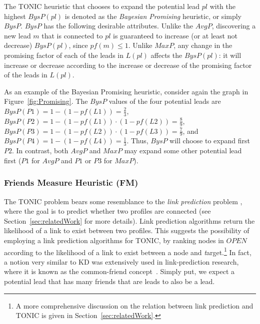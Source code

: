 \documentclass[prodmode,acmtecs]{acmsmall} %
\newcommand{\target}{{\textit target}}
\begin{document}
\noindent The TONIC heuristic that chooses to expand the potential lead $pl$ with the highest $BysP(pl)$ is denoted as the {\em Bayesian Promising} heuristic, or simply $BysP$. $BysP$ has the following desirable attributes. Unlike the $AvgP$, discovering a new lead $m$ that is connected to $pl$ is guaranteed to increase (or at least not decrease) $BysP(pl)$, since $pf(m)\leq 1$. Unlike $MaxP$, any change in the promising factor of each of the leads in $L(pl)$ affects the $BysP(pl)$: it will increase or decrease according to the increase or decrease of the promising factor of the leads in $L(pl)$.


As an example of the Bayesian Promising heuristic, consider again the graph in Figure~\ref{fig:Promising}. 
The $BysP$ values of the four potential leads are $BysP(P1)=1-(1-pf(L1))=\frac{2}{3}$, 
$BysP(P2)=1-(1-pf(L1))\cdot(1-pf(L2))=\frac{8}{9}$, 
$BysP(P3)=1-(1-pf(L2))\cdot(1-pf(L3))=\frac{7}{9}$, and $BysP(P4)=1-(1-pf(L4))=\frac{1}{3}$. 
Thus, $BysP$ will choose to expand first $P2$. 
In contrast, both $AvgP$ and $MaxP$ may expand some other potential lead first ($P1$ for $AvgP$ and $P1$ or $P3$ for $MaxP$). 




\subsubsection{Friends Measure Heuristic (FM)}
\label{sec:friendsMeasure}

The TONIC problem bears some resemblance to the \emph{link prediction} problem \cite{liben2007link}, where the goal is to predict whether two profiles are connected (see Section~\ref{sec:relatedWork} for more details). Link prediction algorithms return the likelihood of a link to exist between two profiles. This suggests the possibility of employing a link prediction algorithms for TONIC, by ranking nodes in $OPEN$ according to the likelihood of a link to exist between a node and \target .\footnote{A more comprehensive discussion on the relation between link prediction and TONIC is given in Section~\ref{sec:relatedWork}.} In fact, a notion very similar to KD was extensively used in link-prediction research, where it is known as the common-friend concept~\cite{liben2007link}. Simply put, we expect a potential lead that has many friends that are leads to also be a lead.
\end{document}
